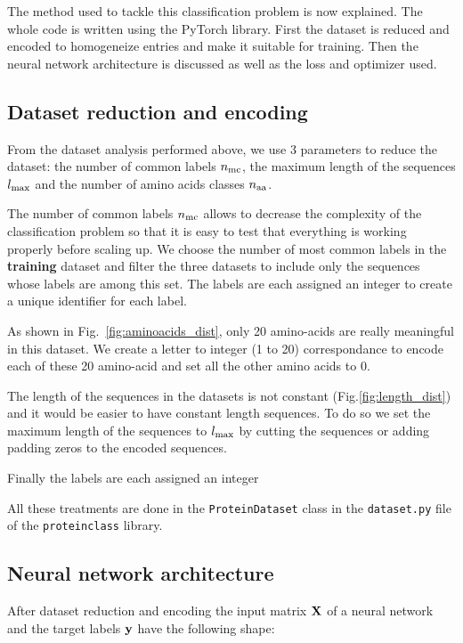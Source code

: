 \documentclass[12pt]{article}
\begin{document}
The method used to tackle this classification problem is now explained. The whole code is written using the PyTorch library. First the dataset is reduced and encoded to homogeneize entries and make it suitable for training. Then the neural network architecture is discussed as well as the loss and optimizer used.

\subsection{Dataset reduction and encoding}

From the dataset analysis performed above, we use 3 parameters to reduce the dataset: the number of common labels $n_\mathrm{mc}$, the maximum length of the sequences $l_\mathrm{max}$ and the number of amino acids classes $n_\mathrm{aa}$.

The number of common labels $n_\mathrm{mc}$ allows to decrease the complexity of the classification problem so that it is easy to test that everything is working properly before scaling up. We choose the number of most common labels in the \textbf{training} dataset and filter the three datasets to include only the sequences whose labels are among this set. The labels are each assigned an integer to create a unique identifier for each label.

As shown in Fig.~\ref{fig:aminoacids_dist}, only 20 amino-acids are really meaningful in this dataset. We create a letter to integer (1 to 20) correspondance to encode each of these 20 amino-acid and set all the other amino acids to 0.

The length of the sequences in the datasets is not constant (Fig.\ref{fig:length_dist}) and it would be easier to have constant length sequences. To do so we set the maximum length of the sequences to $l_\mathrm{max}$ by cutting the sequences or adding padding zeros to the encoded sequences.

Finally the  labels are each assigned an integer

All these treatments are done in the \texttt{ProteinDataset} class in the \texttt{dataset.py} file of the \texttt{proteinclass} library.

\subsection{Neural network architecture}

After dataset reduction and encoding the input matrix $\vb{X}$ of a neural network and the target labels $\vb{y}$ have the following shape:
\end{document}
